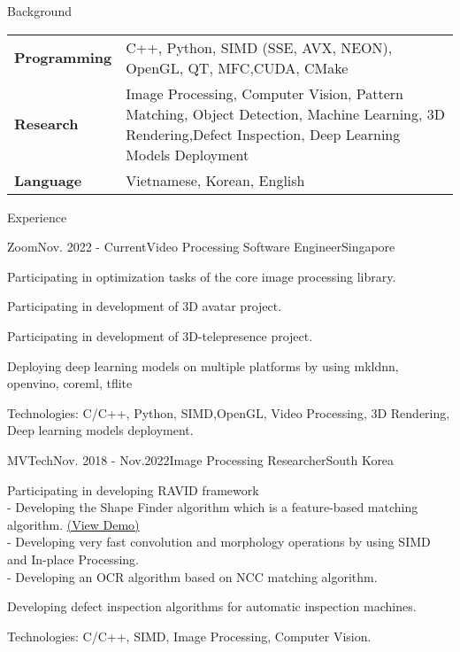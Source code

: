 \documentclass{resume}
\begin{document}
	\begin{rSection}{Background}
		\begin{tabular} {p{0.2\linewidth} p{0.8\linewidth}}
			\bf Programming & C++,  Python, SIMD (SSE, AVX, NEON), OpenGL, QT, MFC,CUDA, CMake \\
			\bf Research & Image Processing,  Computer Vision, Pattern Matching, Object Detection,  Machine Learning, 3D Rendering,Defect Inspection, Deep Learning Models Deployment \\
			\bf Language & Vietnamese, Korean, English
		\end{tabular}
		
	\end{rSection}

	\begin{rSection}{Experience}
		\begin{rSubsection}{Zoom}{Nov. 2022 - Current}{Video Processing Software  Engineer}{Singapore}
			\item Participating in optimization tasks of the core image processing library.
			\item Participating in development of 3D avatar project.
			\item Participating in development of 3D-telepresence project.
			\item Deploying deep learning models on multiple platforms by using mkldnn, openvino,  coreml,  tflite
			\item Technologies: C/C++, Python, SIMD,OpenGL, Video Processing,  3D Rendering,  Deep learning models deployment.

		\end{rSubsection}

		\begin{rSubsection}{MVTech}{Nov. 2018 - Nov.2022}{Image Processing Researcher}{South Korea}
			\item Participating in developing RAVID framework \\
			- Developing the Shape Finder algorithm which is a feature-based matching algorithm. \href{https://blog.naver.com/mvtech_ravid/222119961697}{(View Demo)}\\ 			
- Developing very fast convolution and morphology operations by using SIMD and In-place Processing. \\
			- Developing an OCR algorithm based on NCC matching algorithm.\\	
			\item Developing defect inspection algorithms for automatic inspection machines.
			\item Technologies: C/C++, SIMD, Image Processing, Computer Vision.


\end{rSubsection}
\end{rSection}
\end{document}
